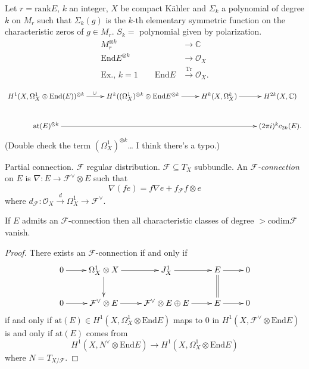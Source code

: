 \begin{theorem}[Atiyah, '57]
\label{theorem-atiyah-57}
Let $r =\text{rank}E$, $k$ an integer, $X$ be
compact Kähler
and $\Sigma_k$ a polynomial of degree $k$ on
$M_r$
such that  $\Sigma_k(g)$ is the $k$-th
elementary
symmetric function on the characteristic
zeros of
$g \in M_r$. $S_k=$ polynomial given by
polarization.
$$
\begin{aligned}
M_r^{\otimes k}&\to \mathbb{C}\\
\text{End}E^{\otimes k}& \to \mathcal{O}_X\\
\text{Ex., $k=1$}\qquad
\text{End}E&\xrightarrow{\text{Tr}}
\mathcal{O}_X.
\end{aligned}
$$

$$
\xymatrix{
H^1(X,\Omega_X^1 \otimes
\text{End}(E))^{\otimes k}\ar[r]^{\cup }
&H^k((\Omega^1_X)^{\otimes k}\otimes
\text{End}E^{\otimes k}\ar[r]
&H^k(X,\Omega_X^k)\ar[r]
&H^{2k}(X,\mathbb{C})\\
\text{at}(E)^{\otimes k}\ar[rrr]
&&&(2\pi i)^kc_{2k}(E).
}
$$
(Double check the term $(\Omega^1_X)^{\otimes
k}$…
I think there's a typo.)

Partial connection. $\mathcal{F}$ regular
distribution.
$\mathcal{F} \subseteq T_X$ subbundle.
An {\it $\mathcal{F}$-connection} on $E$ is
$\nabla:E \to \mathcal{F}^\vee \otimes E$
such that
$$
\nabla(fe)=f\nabla e+f_{\mathcal{F}}f \otimes
e
$$
where
$d_{\mathcal{F}}:\mathcal{O}_X\xrightarrow{d}
\Omega_X^1
\to\mathcal{F}^\vee$.
\end{theorem}

\begin{proposition}
\label{proposition-bott-baum}
If $E$ admits an $\mathcal{F}$-connection
then all characteristic
classes of degree  $>\text{codim}\mathcal{F}$
vanish.
\end{proposition}

\begin{proof}
There exists an $\mathcal{F}$-connection if
and only if
$$
\xymatrix{
0\ar[r]&\Omega_X^1 \otimes
X\ar[r]\ar[d]&J_X^1\ar[r]&E\ar@{=}[d]\ar[r]&
0\\
0\ar[r]&\mathcal{F}^\vee\otimes E\ar[r]&
\mathcal{F}^\vee \otimes E \oplus E\ar[r]&
E\ar[r]&0
}
$$
if and only if $\text{at}(E) \in
H^1(X,\Omega_X^1\otimes\text{End}E)$
maps to 0 in
$H^1(X,\mathcal{F}^\vee\otimes\text{End}E)$
is and only if $\text{at}(E)$ comes from
$$
H^1(X,N^\vee\otimes\text{End}E)\to
H^1(X,\Omega_X^1\otimes\text{End}E)
$$
where $N=T_{X/\mathcal{F}}$.
\end{proof}

